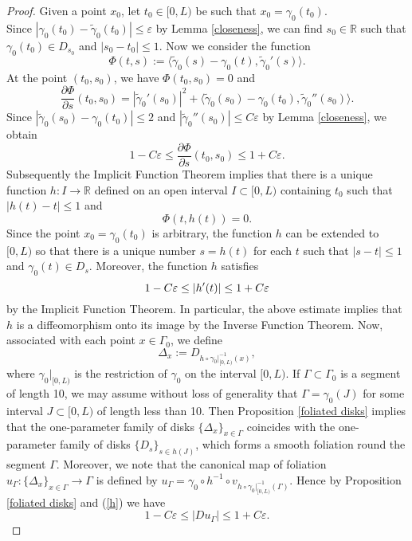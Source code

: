 \documentclass[a4paper, reqno]{amsart}
\theoremstyle{definition}
\theoremstyle{remark}
\numberwithin{equation}{section}
\numberwithin{equation}{section}
\numberwithin{equation}{section}
\begin{document}
\begin{proof}
Given a point $x_0$, let $t_0\in [0,L)$ be such that $x_0 = \gamma_0(t_0)$.\\ Since $|\gamma_0(t_0) - \tilde{\gamma}_0(t_0)|\leq \varepsilon$ by Lemma \ref{closeness}, we can find $s_0\in \mathbb{R}$ such that $\gamma_0(t_0)\in D_{s_0}$ and $|s_0 - t_0|\leq 1$. Now we consider the function 
\[ \Phi(t, s) := \langle\tilde{\gamma}_0(s) - \gamma_0(t), \tilde{\gamma}_0'(s)\rangle.\]
At the point $(t_0, s_0)$, we have $\Phi(t_0, s_0) = 0$ and 
\[ \frac{\partial\Phi}{\partial s}(t_0, s_0) = |\tilde{\gamma}_0'(s_0)|^2 + \langle\tilde{\gamma}_0(s_0) - \gamma_0(t_0), \tilde{\gamma}_0''(s_0)\rangle.\]
Since $|\tilde{\gamma}_0(s_0) - \gamma_0(t_0)|\leq 2$ and $|\tilde{\gamma}_0''(s_0)|\leq C\varepsilon$ by Lemma \ref{closeness}, we obtain
\[ 1 - C\varepsilon\leq \frac{\partial\Phi}{\partial s}(t_0, s_0)\leq 1 + C\varepsilon. \]
Subsequently the Implicit Function Theorem implies that there is a unique function $h: I\to\mathbb{R}$ defined on an open interval $I\subset [0,L)$ containing $t_0$ such that $|h(t)-t|\leq 1$ and 
\[ \Phi(t, h(t)) = 0.\]
 Since the point $x_0 = \gamma_0(t_0)$ is arbitrary, the function $h$ can be extended to $[0,L)$ so that there is a unique number $s = h(t)$ for each $t$ such that $|s-t|\leq 1$ and $\gamma_0(t)\in D_s$. Moreover, the function $h$ satisfies 
\begin{equation}{\label{h}}
	1 - C\varepsilon\leq |h'(t)| \leq 1 +C\varepsilon
\end{equation}
by the Implicit Function Theorem. In particular, the above estimate implies that $h$ is a diffeomorphism onto its image by the Inverse Function Theorem. Now, associated with each point $x\in\Gamma_0$, we define
\[ \Delta_x := D_{h\circ\gamma_0|_{[0,L)}^{-1}(x)},\]
where $\gamma_0|_{[0,L)}$ is the restriction of $\gamma_0$ on the interval $[0,L)$.
If $\Gamma\subset\Gamma_0$ is a segment of length 10, we may assume without loss of generality that $\Gamma = \gamma_0(J)$ for some interval $J\subset [0,L)$ of length less than 10. Then Proposition \ref{foliated disks} implies that the one-parameter family of disks $\{\Delta_x\}_{x\in\Gamma}$ coincides with the one-parameter family of disks $\{D_s\}_{s\in h(J)}$, which forms a smooth foliation round the segment $\Gamma$. Moreover, we note that the canonical map of foliation $u_{\Gamma}: \{\Delta_x\}_{x\in\Gamma}\to \Gamma$ is defined by $u_{\Gamma} = \gamma_0\circ h^{-1}\circ v_{h\circ\gamma_0|_{[0,L)}^{-1}(\Gamma)}$. Hence by Proposition \ref{foliated disks} and (\ref{h}) we have
\[ 1 - C\varepsilon \leq |Du_{\Gamma}| \leq 1 + C\varepsilon.\]
	
\end{proof}
\end{document}
